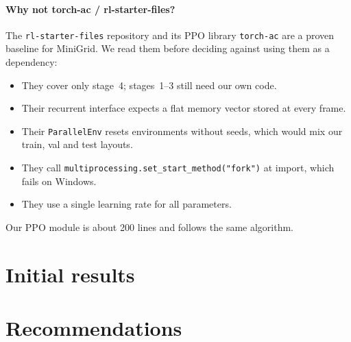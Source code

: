 \documentclass[11pt,a4paper]{article}
\newcommand{\code}[1]{\texttt{\small #1}}
\begin{document}
\paragraph{Why not torch-ac / rl-starter-files?} The \code{rl-starter-files} repository and its PPO library
\code{torch-ac} are a proven baseline for MiniGrid. We read them before deciding against using them as a dependency:
\begin{itemize}
\item They cover only stage~4; stages~1--3 still need our own code.
\item Their recurrent interface expects a flat memory vector stored at every frame.
\item Their \code{ParallelEnv} resets environments without seeds, which would mix our train, val and test layouts.
\item They call \code{multiprocessing.set\_start\_method("fork")} at import, which fails on Windows.
\item They use a single learning rate for all parameters.
\end{itemize}
Our PPO module is about 200 lines and follows the same algorithm.

\section{Initial results}
\label{sec:results}



\section{Recommendations}
\label{sec:recs}
\end{document}
